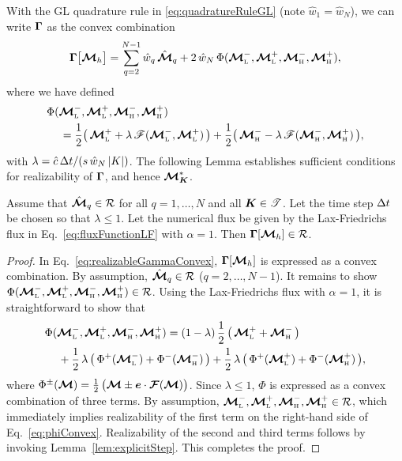 With the GL quadrature rule in \eqref{eq:quadratureRuleGL} (note $\hat{w}_{1}=\hat{w}_{N}$), we can write $\boldsymbol{\Gamma}$ as the convex combination
\begin{equation}
  \boldsymbol{\Gamma}\big[\boldsymbol{\mathcal{M}}_{h}\big]
  =\sum_{q=2}^{N-1}\hat{w}_{q}\,\hat{\boldsymbol{\mathcal{M}}}_{q}
  +2\,\hat{w}_{N}\,\Phi(\boldsymbol{\mathcal{M}}_{\mbox{\tiny L}}^{-},\boldsymbol{\mathcal{M}}_{\mbox{\tiny L}}^{+},\boldsymbol{\mathcal{M}}_{\mbox{\tiny H}}^{-},\boldsymbol{\mathcal{M}}_{\mbox{\tiny H}}^{+}),
  \label{eq:realizableGammaConvex}
\end{equation}
where we have defined
\begin{align}
  &\Phi(\boldsymbol{\mathcal{M}}_{\mbox{\tiny L}}^{-},\boldsymbol{\mathcal{M}}_{\mbox{\tiny L}}^{+},\boldsymbol{\mathcal{M}}_{\mbox{\tiny H}}^{-},\boldsymbol{\mathcal{M}}_{\mbox{\tiny H}}^{+}) \nonumber \\
  &\hspace{12pt}
  =\frac{1}{2}\big(\,\boldsymbol{\mathcal{M}}_{\mbox{\tiny L}}^{+}+\lambda\,\mathscr{F}(\boldsymbol{\mathcal{M}}_{\mbox{\tiny L}}^{-},\boldsymbol{\mathcal{M}}_{\mbox{\tiny L}}^{+})\,\big)
  +\frac{1}{2}\big(\,\boldsymbol{\mathcal{M}}_{\mbox{\tiny H}}^{-}-\lambda\,\mathscr{F}(\boldsymbol{\mathcal{M}}_{\mbox{\tiny H}}^{-},\boldsymbol{\mathcal{M}}_{\mbox{\tiny H}}^{+})\,\big),
\end{align}
with $\lambda=\hat{c}\,\Delta t/(s\,\hat{w}_{N}\,|K|)$.  
The following Lemma establishes sufficient conditions for realizability of $\boldsymbol{\Gamma}$, and hence $\boldsymbol{\mathcal{M}}_{\boldsymbol{K}}^{*}$.  
\begin{lemma}
  Assume that $\hat{\boldsymbol{\mathcal{M}}}_{q}\in\mathcal{R}$ for all $q=1,\ldots,N$ and all $\boldsymbol{K}\in\mathscr{T}$.  
  Let the time step $\Delta t$ be chosen so that $\lambda\le1$.  
  Let the numerical flux be given by the Lax-Friedrichs flux in Eq.~\eqref{eq:fluxFunctionLF} with $\alpha=1$.  
  Then $\boldsymbol{\Gamma}[\boldsymbol{\mathcal{M}}_{h}]\in\mathcal{R}$.  
\end{lemma}
\begin{proof}
  In Eq.~\eqref{eq:realizableGammaConvex}, $\boldsymbol{\Gamma}[\boldsymbol{\mathcal{M}}_{h}]$ is expressed as a convex combination.  
  By assumption, $\hat{\boldsymbol{\mathcal{M}}}_{q}\in\mathcal{R}$ ($q=2,\ldots,N-1$).  
  It remains to show $\Phi(\boldsymbol{\mathcal{M}}_{\mbox{\tiny L}}^{-},\boldsymbol{\mathcal{M}}_{\mbox{\tiny L}}^{+},\boldsymbol{\mathcal{M}}_{\mbox{\tiny H}}^{-},\boldsymbol{\mathcal{M}}_{\mbox{\tiny H}}^{+})\in\mathcal{R}$.  
  Using the Lax-Friedrichs flux with $\alpha=1$, it is straightforward to show that
  \begin{align}
    &\Phi(\boldsymbol{\mathcal{M}}_{\mbox{\tiny L}}^{-},\boldsymbol{\mathcal{M}}_{\mbox{\tiny L}}^{+},\boldsymbol{\mathcal{M}}_{\mbox{\tiny H}}^{-},\boldsymbol{\mathcal{M}}_{\mbox{\tiny H}}^{+})
    =(1-\lambda)\,\frac{1}{2}\,\big(\,\boldsymbol{\mathcal{M}}_{\mbox{\tiny L}}^{+}+\boldsymbol{\mathcal{M}}_{\mbox{\tiny H}}^{-}\,\big) \nonumber \\
    &\hspace{12pt}
    +\frac{1}{2}\,\lambda\,\big(\,\Phi^{+}(\boldsymbol{\mathcal{M}}_{\mbox{\tiny L}}^{-})+\Phi^{-}(\boldsymbol{\mathcal{M}}_{\mbox{\tiny H}}^{-})\,\big)
    +\frac{1}{2}\,\lambda\,\big(\,\Phi^{+}(\boldsymbol{\mathcal{M}}_{\mbox{\tiny L}}^{+})+\Phi^{-}(\boldsymbol{\mathcal{M}}_{\mbox{\tiny H}}^{+})\,\big),
    \label{eq:phiConvex}
  \end{align}
  where $\Phi^{\pm}(\boldsymbol{\mathcal{M}})=\frac{1}{2}\,\big(\boldsymbol{\mathcal{M}}\pm\boldsymbol{e}\cdot\boldsymbol{\mathcal{F}}(\boldsymbol{\mathcal{M}})\big)$.  
  Since $\lambda\le1$, $\Phi$ is expressed as a convex combination of three terms.  
  By assumption, $\boldsymbol{\mathcal{M}}_{\mbox{\tiny L}}^{-},\boldsymbol{\mathcal{M}}_{\mbox{\tiny L}}^{+},\boldsymbol{\mathcal{M}}_{\mbox{\tiny H}}^{-},\boldsymbol{\mathcal{M}}_{\mbox{\tiny H}}^{+}\in\mathcal{R}$, which immediately implies realizability of the first term on the right-hand side of Eq.~\eqref{eq:phiConvex}.  
  Realizability of the second and third terms follows by invoking Lemma~\ref{lem:explicitStep}.  
  This completes the proof.  
\end{proof}